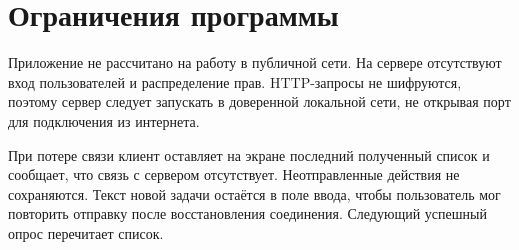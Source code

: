\section{Ограничения программы}

Приложение не рассчитано на работу в публичной сети. На сервере отсутствуют вход пользователей и распределение прав. HTTP-запросы не шифруются, поэтому сервер следует запускать в доверенной локальной сети, не открывая порт для подключения из интернета.

При потере связи клиент оставляет на экране последний полученный список и сообщает, что связь с сервером отсутствует. Неотправленные действия не сохраняются. Текст новой задачи остаётся в поле ввода, чтобы пользователь мог повторить отправку после восстановления соединения. Следующий успешный опрос перечитает список.
